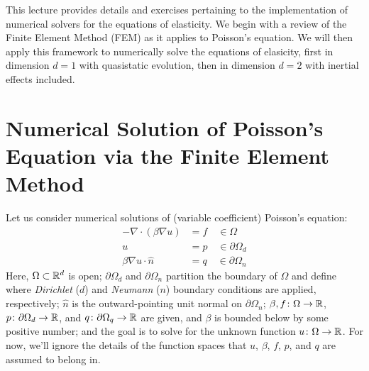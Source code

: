 
This lecture provides details and exercises pertaining to the implementation of numerical solvers for the equations of elasticity. We begin with a review of the Finite Element Method (FEM) as it applies to Poisson's equation. We will then apply this framework to numerically solve the equations of elasicity, first in dimension $d = 1$ with quasistatic evolution, then in dimension $d = 2$ with inertial effects included.

\section{Numerical Solution of Poisson's Equation via the Finite Element Method}

Let us consider numerical solutions of (variable coefficient) Poisson's equation:
\begin{subequations}
\begin{align}\label{eq:poisson.strong}
-\nabla \cdot \left( \beta \nabla u \right) & = f \quad \in \Omega \\
u & = p \quad \in \partial \Omega_d \\
\beta \nabla u \cdot \hat{n} & = q \quad \in \partial \Omega_n
\end{align}
\end{subequations}
Here, $\Omega \subset \mathbb{R}^d$ is open; $\partial \Omega_d$ and $\partial \Omega_n$ partition the boundary of $\Omega$ and define where \emph{Dirichlet} ($d$) and \emph{Neumann} ($n$) boundary conditions are applied, respectively; $\hat{n}$ is the outward-pointing unit normal on $\partial \Omega_n$; $\beta, f \colon \Omega \to \mathbb{R}$, $p \colon \partial \Omega_d \to \mathbb{R}$, and $q \colon \partial \Omega_q \to \mathbb{R}$ are given, and $\beta$ is bounded below by some positive number; and the goal is to solve for the unknown function $u \colon \Omega \to \mathbb{R}$. For now, we'll ignore the details of the function spaces that $u$, $\beta$, $f$, $p$, and $q$ are assumed to belong in.

